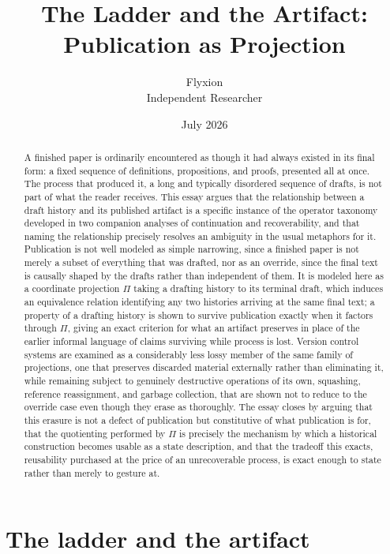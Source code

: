 \documentclass[11pt]{article}
\title{The Ladder and the Artifact: \\ Publication as Projection}
\author{Flyxion \\ \small Independent Researcher}
\date{July 2026}
\begin{document}
\maketitle

\begin{abstract}
A finished paper is ordinarily encountered as though it had always existed in its final form: a fixed sequence of definitions, propositions, and proofs, presented all at once. The process that produced it, a long and typically disordered sequence of drafts, is not part of what the reader receives. This essay argues that the relationship between a draft history and its published artifact is a specific instance of the operator taxonomy developed in two companion analyses of continuation and recoverability, and that naming the relationship precisely resolves an ambiguity in the usual metaphors for it. Publication is not well modeled as simple narrowing, since a finished paper is not merely a subset of everything that was drafted, nor as an override, since the final text is causally shaped by the drafts rather than independent of them. It is modeled here as a coordinate projection $\Pi$ taking a drafting history to its terminal draft, which induces an equivalence relation identifying any two histories arriving at the same final text; a property of a drafting history is shown to survive publication exactly when it factors through $\Pi$, giving an exact criterion for what an artifact preserves in place of the earlier informal language of claims surviving while process is lost. Version control systems are examined as a considerably less lossy member of the same family of projections, one that preserves discarded material externally rather than eliminating it, while remaining subject to genuinely destructive operations of its own, squashing, reference reassignment, and garbage collection, that are shown not to reduce to the override case even though they erase as thoroughly. The essay closes by arguing that this erasure is not a defect of publication but constitutive of what publication is for, that the quotienting performed by $\Pi$ is precisely the mechanism by which a historical construction becomes usable as a state description, and that the tradeoff this exacts, reusability purchased at the price of an unrecoverable process, is exact enough to state rather than merely to gesture at.
\end{abstract}

\newpage

\section{The ladder and the artifact}
\end{document}
